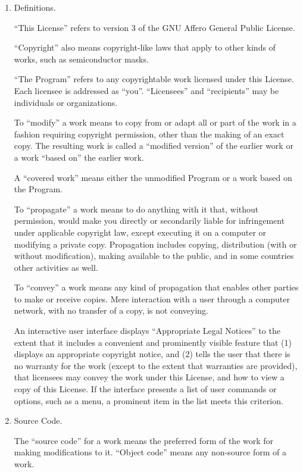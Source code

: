 \documentclass[11pt]{article}
\begin{document}
\begin{enumerate}

\addtocounter{enumi}{-1}

\item Definitions.

``This License'' refers to version 3 of the GNU Affero General Public License.

``Copyright'' also means copyright-like laws that apply to other kinds of
works, such as semiconductor masks.

``The Program'' refers to any copyrightable work licensed under this
License.  Each licensee is addressed as ``you''.  ``Licensees'' and
``recipients'' may be individuals or organizations.

To ``modify'' a work means to copy from or adapt all or part of the work
in a fashion requiring copyright permission, other than the making of an
exact copy.  The resulting work is called a ``modified version'' of the
earlier work or a work ``based on'' the earlier work.

A ``covered work'' means either the unmodified Program or a work based
on the Program.

To ``propagate'' a work means to do anything with it that, without
permission, would make you directly or secondarily liable for
infringement under applicable copyright law, except executing it on a
computer or modifying a private copy.  Propagation includes copying,
distribution (with or without modification), making available to the
public, and in some countries other activities as well.

To ``convey'' a work means any kind of propagation that enables other
parties to make or receive copies.  Mere interaction with a user through
a computer network, with no transfer of a copy, is not conveying.

An interactive user interface displays ``Appropriate Legal Notices''
to the extent that it includes a convenient and prominently visible
feature that (1) displays an appropriate copyright notice, and (2)
tells the user that there is no warranty for the work (except to the
extent that warranties are provided), that licensees may convey the
work under this License, and how to view a copy of this License.  If
the interface presents a list of user commands or options, such as a
menu, a prominent item in the list meets this criterion.

\item Source Code.

The ``source code'' for a work means the preferred form of the work
for making modifications to it.  ``Object code'' means any non-source
form of a work.


\end{enumerate}
\end{document}
